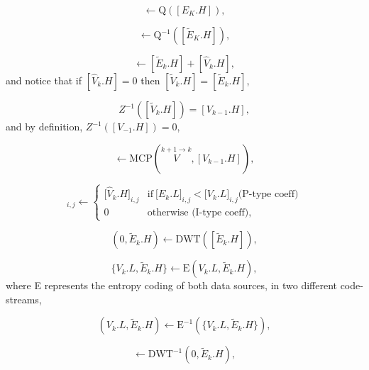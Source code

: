 \begin{equation}
  [\tilde{E}_k.H] \leftarrow \text{Q}([E_K.H]),
  \tag{d}
\end{equation}

\begin{equation}
  [\tilde{E}_k.H] \leftarrow  \text{Q}^{-1}([\tilde{E}_K.H]),
  \tag{E.g}
\end{equation}

\begin{equation}
  [\tilde{V}_k.H] \leftarrow [\tilde{E}_k.H] + [\hat{V}_k.H],
  \tag{E.h}
\end{equation}
and notice that if $[\hat{V}_k.H]=0$ then $[\tilde{V}_k.H] =
[\tilde{E}_k.H]$,

\begin{equation}
  Z^{-1}([\tilde{V}_k.H]) = [V_{k-1}.H],
  \tag{E.i}
\end{equation}
and by definition, $Z^{-1}([V_{-1}.H]) = 0$,

\begin{equation}
  [\hat{V}_k.H] \leftarrow \text{MCP}(\overset{k+1\rightarrow k}{V}, [V_{k-1}.H]),
  \tag{E.j}
\end{equation}

\begin{equation}
  [\hat{W}_k.H]_{i,j} \leftarrow \left\{
    \begin{array}{ll}
      {[}\hat{V}_k.H{]}_{i,j}  & \text{if}~{[}E_k.L{]}_{i,j} < {[}V_k.L{]}_{i,j} \text{(P-type coeff)} \\
      0                       & \text{otherwise (I-type coeff)},
    \end{array}
  \right.
  \tag{E.k}
\end{equation}
  
\begin{equation}
  (0, \tilde{E}_k.H) \leftarrow \text{DWT}([\tilde{E}_k.H]),
  \tag{f}
\end{equation}

\begin{equation}
  \{V_k.L, \tilde{E}_k.H\} \leftarrow \text{E}(V_k.L, \tilde{E}_k.H),
  \tag{g}
\end{equation}
where E represents the entropy coding of both data sources, in two
different code-streams,

\begin{equation}
  (V_k.L, \tilde{E}_k.H) \leftarrow \text{E}^{-1}(\{V_k.L, \tilde{E}_k.H\}),
  \tag{h}
\end{equation}

\begin{equation}
  [\tilde{E}_k.H] \leftarrow \text{DWT}^{-1}(0, \tilde{E}_k.H),
  \tag{i}
\end{equation}

